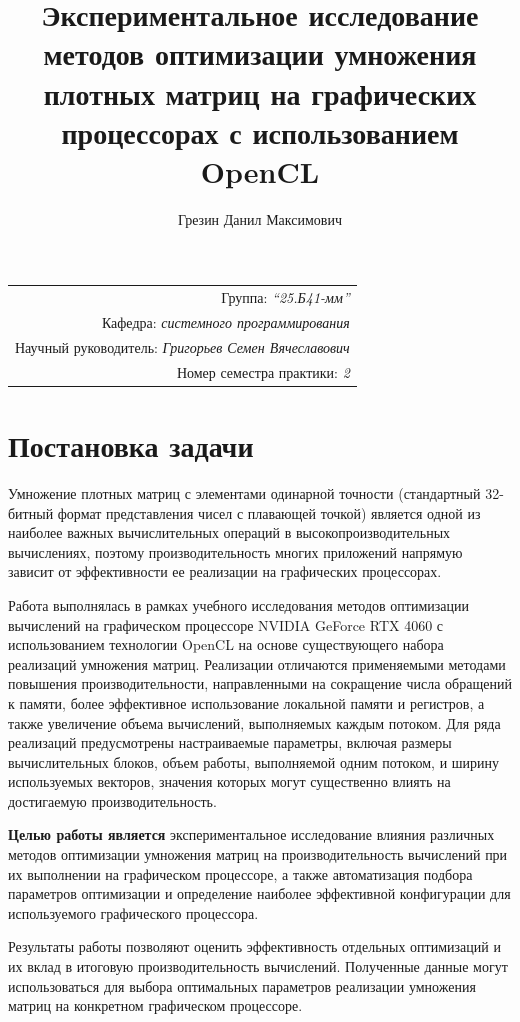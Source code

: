 \documentclass[a4paper]{article}
\title{Экспериментальное исследование методов оптимизации умножения плотных матриц на графических процессорах с использованием OpenCL}
\author{Грезин Данил Максимович}
\date{}
\begin{document}
\maketitle
\begin{flushright}
\begin{tabular}{r}
    Группа: \emph{\enquote{25.Б41-мм}} \\
    Кафедра: \emph{системного программирования} \\
    Научный руководитель: \emph{Григорьев Семен Вячеславович} \\
    Номер семестра практики: \emph{2} \\
\end{tabular}
\end{flushright}

\section{Постановка задачи}

Умножение плотных матриц с элементами одинарной точности (стандартный 32-битный формат представления чисел с плавающей точкой) является одной из наиболее важных вычислительных операций в высокопроизводительных вычислениях, поэтому производительность многих приложений напрямую зависит от эффективности ее реализации на графических процессорах.

Работа выполнялась в рамках учебного исследования методов оптимизации вычислений на графическом процессоре NVIDIA GeForce RTX 4060 с использованием технологии OpenCL на основе существующего набора реализаций умножения матриц. Реализации отличаются применяемыми методами повышения производительности, направленными на сокращение числа обращений к памяти, более эффективное использование локальной памяти и регистров, а также увеличение объема вычислений, выполняемых каждым потоком. Для ряда реализаций предусмотрены настраиваемые параметры, включая размеры вычислительных блоков, объем работы, выполняемой одним потоком, и ширину используемых векторов, значения которых могут существенно влиять на достигаемую производительность.

\textbf{Целью работы является} экспериментальное исследование влияния различных методов оптимизации умножения матриц на производительность вычислений при их выполнении на графическом процессоре, а также автоматизация подбора параметров оптимизации и определение наиболее эффективной конфигурации для используемого графического процессора.

Результаты работы позволяют оценить эффективность отдельных оптимизаций и их вклад в итоговую производительность вычислений. Полученные данные могут использоваться для выбора оптимальных параметров реализации умножения матриц на конкретном графическом процессоре.
\end{document}
